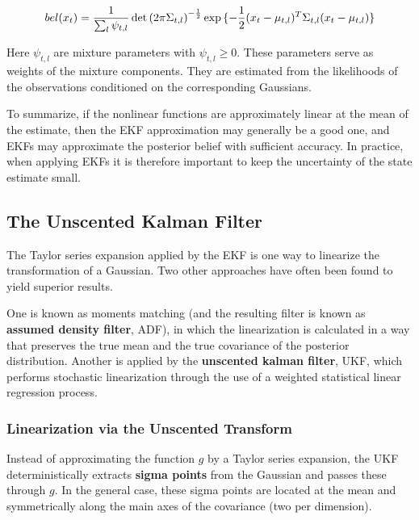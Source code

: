\begin{equation}
  bel(x_t) = \frac{1}{\sum_{l}{\psi_{t,l}}} \det{(2\pi \Sigma_{t,l})}^{-\frac{1}{2}} \exp{ \{ -\frac{1}{2} (x_t - \mu_{t,l})^T \Sigma_{t,l} (x_t - \mu_{t,l}) \}} \\
  \label{eq:Mixture of Gaussians}
\end{equation}

Here $\psi_{t,l}$ are mixture parameters with $\psi_{t,l} \geq 0$.
These parameters serve as weights of the mixture components.
They are estimated from the likelihoods of the observations conditioned on the corresponding Gaussians.

\vspace{2mm}

To summarize, if the nonlinear functions are approximately linear at the mean of the estimate, then the EKF approximation may generally be a good
one, and EKFs may approximate the posterior belief with sufficient accuracy.
In practice, when applying EKFs it is therefore important to keep the uncertainty of the state estimate small.

\newpage

\subsection{The Unscented Kalman Filter}

The Taylor series expansion applied by the EKF is one way to linearize the transformation of a Gaussian.
Two other approaches have often been found to yield superior results.

\vspace{2mm}

One is known as moments matching (and the resulting filter is known as \textbf{assumed density filter}, ADF), in which the linearization is calculated in a way that preserves the true mean and the true covariance of the posterior distribution.
Another is applied by the \textbf{unscented kalman filter}, UKF, which performs stochastic linearization through the use of a weighted statistical linear regression process.

\subsubsection{Linearization via the Unscented Transform}

Instead of approximating the function $g$ by a Taylor series expansion, the UKF deterministically extracts \textbf{sigma points} from the Gaussian and passes these through $g$.
In the general case, these sigma points are located at the mean and symmetrically along the main axes of the covariance (two per dimension).

